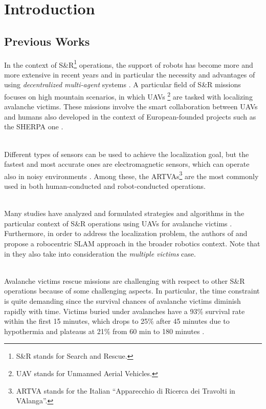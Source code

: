 \documentclass[main]{subfiles}
\begin{document}
\section{Introduction}
\label{intro}

\subsection{Previous Works}
In the context of S\&R\footnote{S\&R stands for Search and Rescue.} operations, 
the support of robots has become more and more extensive in recent years 
\cite{sr0, sr1} and in particular the necessity and advantages of using 
\textit{decentralized multi-agent} systems \cite{multiagent}. A particular field 
of S\&R missions focuses on high mountain scenarios, in which UAVs 
\footnote{UAV stands for Unmanned Aerial Vehicles.} are tasked with localizing 
avalanche victims. These missions involve the smart collaboration between UAVs 
and humans also developed in the context of European-founded projects such as 
the SHERPA one \cite{sherpa}.

\noindent\\Different types of sensors can be used to achieve the localization goal, but the 
fastest and most accurate ones are electromagnetic sensors, which can operate 
also in noisy environments \cite{sensors}. Among these, the ARTVAs\footnote{ARTVA 
stands for the Italian “Apparecchio di Ricerca dei Travolti in VAlanga”.} are the 
most commonly used in both human-conducted and robot-conducted operations.

\noindent\\
Many studies have analyzed and formulated strategies and algorithms in the 
particular context of S\&R operations using UAVs for avalanche victims 
\cite{main, precedente, pre-main}. Furthermore, in order to address 
the localization problem, the authors of \cite{similar-main} and 
\cite{first-model} propose a robocentric SLAM approach in the broader robotics 
context. Note that in \cite{similar-main} they also take into consideration the 
\textit{multiple victims} case.

\noindent\\Avalanche victims rescue missions are challenging with respect to 
other S\&R operations because of some challenging aspects. In particular, the 
time constraint is quite demanding since the survival chances of avalanche 
victims diminish rapidly with time. Victims buried under avalanches have a 93\% 
survival rate within the first 15 minutes, which drops to 25\% after 45 minutes 
due to hypothermia \cite{survival} and plateaus at 21\% from 60 min to 180 
minutes \cite{survival2}.
\end{document}
